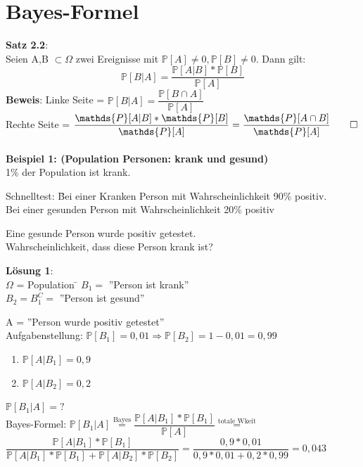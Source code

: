  \section{Bayes-Formel}
\textbf{Satz 2.2}:\\
Seien A,B $\subset \Omega$ zwei Ereignisse mit $\mathds{P}[A] \neq 0, \mathds{P}[B] \neq 0$. Dann gilt:
$$\mathds{P}[B \vert A] = \dfrac{\mathds{P}[A\vert B] * \mathds{P}[B]}{\mathds{P}[A]}$$
\textbf{Beweis}: Linke Seite = $\mathds{P}[B\vert A] = \dfrac{\mathds{P}[B \cap A]}{\mathds{P}[A]}$\smallskip\\
Rechte Seite = $\dfrac{\mathds{P}[A \vert B] * \mathds{P}[B]}{\mathds{P}[A]} = \dfrac{\mathds{P}[A \cap B]}{\mathds{P}[A]} \qed$\\\\
\textbf{Beispiel 1: (Population Personen: krank und gesund)}\medskip\\
1\% der Population ist krank.
\begin{tabbing}
	Schnelltest: \= Bei einer Kranken Person mit Wahrscheinlichkeit 90\% positiv.\\
	\> Bei einer gesunden Person mit Wahrscheinlichkeit 20\% positiv
\end{tabbing}
Eine gesunde Person wurde positiv getestet.\\
Wahrscheinlichkeit, dass diese Person krank ist?\smallskip
\begin{tabbing}
\textbf{Lösung 1}:\medskip\\
$\Omega$ = Population \hspace{1cm} \= $B_1 = $ ''Person ist krank''\\
\> $B_2 = B_1^C = $ ''Person ist gesund''
\end{tabbing}
A = ''Person wurde positiv getestet''\\
Aufgabenstellung: $\mathds{P}[B_1] = 0,01 \Rightarrow \mathds{P}[B_2] = 1-0,01=0,99$
\begin{enumerate}
	\item $\mathds{P}[A \vert B_1] = 0,9$
	\item $\mathds{P}[A \vert B_2] = 0,2$
\end{enumerate}
$\mathds{P}[B_1\vert A] = ?$\\
Bayes-Formel: $\mathds{P}[B_1 \vert A] \overset{\text{Bayes}}{=} \dfrac{\mathds{P}[A\vert B_1] * \mathds{P}[B_1]}{\mathds{P}[A]} \overset{\text{totale Wkeit}}{=} $\smallskip\\$
\dfrac{\mathds{P}[A \vert B_1]*\mathds{P}[B_1]}{\mathds{P}[A \vert B_1]*\mathds{P}[B_1]+\mathds{P}[A\vert B_2]*\mathds{P}[B_2]} = \dfrac{0,9*0,01}{0,9*0,01+0,2*0,99}= 0,043$\medskip\\
